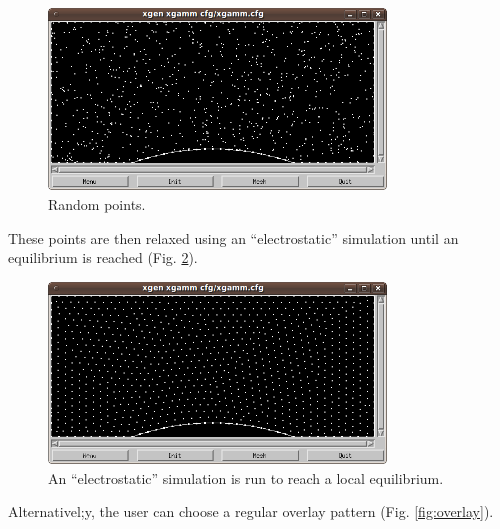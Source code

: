 \documentclass[12pt]{article}
\begin{document}
  \begin{figure}[!ht]
  \begin{center}
  \includegraphics[width=0.8\textwidth]{xgen-4.png}
  \end{center}
  \vspace{-6mm}
  \caption{Random points.}
  \label{fig:random}
  \end{figure}
\noindent
These points are then relaxed using an ``electrostatic'' simulation
until an equilibrium is reached  (Fig. \ref{fig:equil}).

  \begin{figure}[!ht]
  \begin{center}
  \includegraphics[width=0.8\textwidth]{xgen-5.png}
  \end{center}
  \vspace{-6mm}
  \caption{An ``electrostatic'' simulation is run to reach a local equilibrium.}
  \label{fig:equil}
\vspace{-1cm}
  \end{figure}

\newpage
\noindent
Alternativel;y, the user can choose a regular overlay pattern (Fig. \ref{fig:overlay}). 
\end{document}
